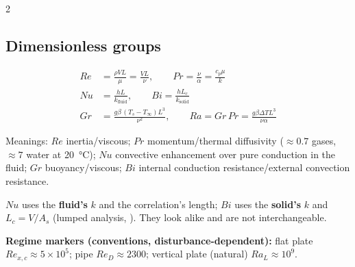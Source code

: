 \begin{multicols}{2}
\subsection{Dimensionless groups}\label{sec:dimless}
\begin{formulabox}
\vspace{-6pt}
\begin{align}
Re &= \frac{\rho VL}{\mu}=\frac{VL}{\nu},\qquad Pr=\frac{\nu}{\alpha}=\frac{c_p\mu}{k} \label{F:conv:ReP}\\
Nu &= \frac{hL}{k_{\text{fluid}}},\qquad Bi=\frac{hL_c}{k_{\text{solid}}} \label{F:conv:NuBi}\\
Gr &= \frac{g\beta\,(T_s-T_\infty)L^3}{\nu^2},\qquad Ra=Gr\,Pr=\frac{g\beta\Delta T L^3}{\nu\alpha} \label{F:conv:GrRa}
\end{align}
\end{formulabox}
Meanings: $Re$ inertia/viscous; $Pr$ momentum/thermal diffusivity ($\approx0.7$ gases, $\approx7$ water at \SI{20}{\celsius}); $Nu$ convective enhancement over pure conduction in the fluid; $Gr$ buoyancy/viscous; $Bi$ internal conduction resistance/external convection resistance.

\begin{trapbox}$Nu$ uses the \textbf{fluid's} $k$ and the correlation's length; $Bi$ uses the \textbf{solid's} $k$ and $L_c=V/A_s$ (lumped analysis, ). They look alike and are not interchangeable.\end{trapbox}

\textbf{Regime markers (conventions, disturbance-dependent):} flat plate $Re_{x,c}\approx5\times10^5$; pipe $Re_D\approx2300$; vertical plate (natural) $Ra_L\approx10^9$.


\end{multicols}
